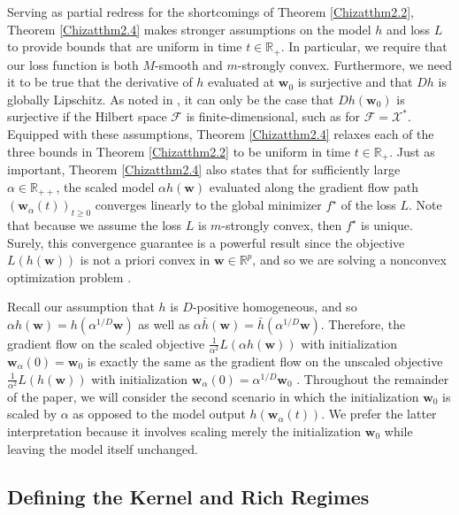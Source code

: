 \documentclass{article}
\begin{document}
Serving as partial redress for the shortcomings of Theorem \ref{Chizatthm2.2}, Theorem \ref{Chizatthm2.4} makes stronger assumptions on the model $h$ and loss $L$ to provide bounds that are uniform in time $t \in \mathbb{R}_+$. In particular, we require that our loss function is both $M$-smooth and $m$-strongly convex. Furthermore, we need it to be true that the derivative of $h$ evaluated at $\boldsymbol{w}_0$ is surjective and that $Dh$ is globally Lipschitz. As noted in \cite{chizat2018lazy}, it can only be the case that $Dh(\boldsymbol{w}_0)$ is surjective if the Hilbert space $\mathcal{F}$ is finite-dimensional, such as for $\mathcal{F} = \mathcal{X}^*$. Equipped with these assumptions, Theorem \ref{Chizatthm2.4} relaxes each of the three bounds in Theorem \ref{Chizatthm2.2} to be uniform in time $t \in \mathbb{R}_+$. Just as important, Theorem \ref{Chizatthm2.4} also states that for sufficiently large $\alpha \in \mathbb{R}_{++}$, the scaled model $\alpha h(\boldsymbol{w})$ evaluated along the gradient flow path $(\boldsymbol{w}_{\alpha}(t))_{t \geq 0}$ converges linearly to the global minimizer $f^{\star}$ of the loss $L$. Note that because we assume the loss $L$ is $m$-strongly convex, then $f^{\star}$ is unique. Surely, this convergence guarantee is a powerful result since the objective $L(h(\boldsymbol{w}))$ is not a priori convex in $\boldsymbol{w} \in \mathbb{R}^p$, and so we are solving a nonconvex optimization problem \cite{chizat2018lazy}.

Recall our assumption that $h$ is $D$-positive homogeneous, and so $\alpha h(\boldsymbol{w}) = h(\alpha^{1/D}\boldsymbol{w})$ as well as $\alpha \bar{h}(\boldsymbol{w}) = \bar{h}(\alpha^{1/D}\boldsymbol{w})$.
Therefore, the gradient flow on the scaled objective $\frac{1}{\alpha^2}L(\alpha h(\boldsymbol{w}))$ with initialization $\boldsymbol{w}_{\alpha}(0) = \boldsymbol{w}_0$ is exactly the same as the gradient flow on the unscaled objective $\frac{1}{\alpha^2}L(h(\boldsymbol{w}))$ with initialization $\boldsymbol{w}_{\alpha}(0) = \alpha^{1/D}\boldsymbol{w}_0$ \cite{woodworth2020kernel}. Throughout the remainder of the paper, we will consider the second scenario in which the initialization $\boldsymbol{w}_0$ is scaled by $\alpha$ as opposed to the model output $h(\boldsymbol{w}_{\alpha}(t))$. We prefer the latter interpretation because it involves scaling merely the initialization $\boldsymbol{w}_0$ while leaving the model itself unchanged.

\subsection{Defining the Kernel and Rich Regimes}\label{defkernelrich}
\end{document}
